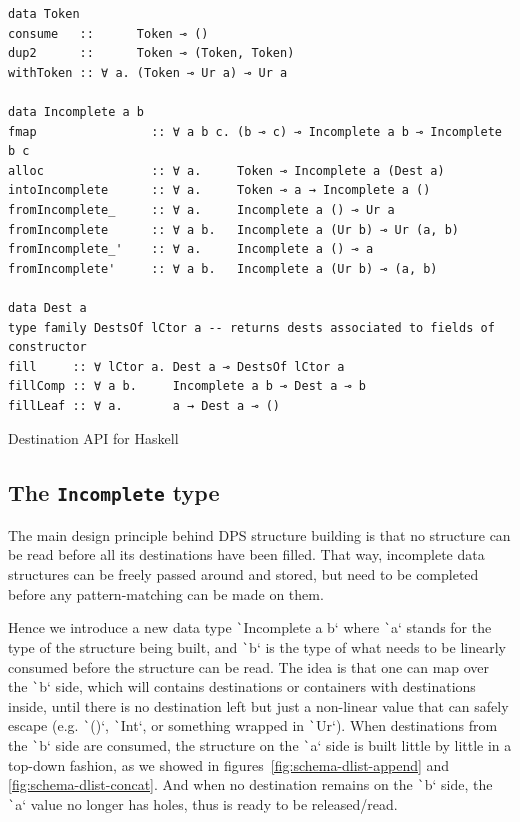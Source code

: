 \documentclass[english]{jflart}
\begin{document}
\begin{table}[t]
\small
\begin{verbatim}
data Token
consume   ::      Token ⊸ ()
dup2      ::      Token ⊸ (Token, Token)
withToken :: ∀ a. (Token ⊸ Ur a) ⊸ Ur a

data Incomplete a b
fmap                :: ∀ a b c. (b ⊸ c) ⊸ Incomplete a b ⊸ Incomplete b c
alloc               :: ∀ a.     Token ⊸ Incomplete a (Dest a)
intoIncomplete      :: ∀ a.     Token ⊸ a → Incomplete a ()
fromIncomplete_     :: ∀ a.     Incomplete a () ⊸ Ur a
fromIncomplete      :: ∀ a b.   Incomplete a (Ur b) ⊸ Ur (a, b)
fromIncomplete_'    :: ∀ a.     Incomplete a () ⊸ a
fromIncomplete'     :: ∀ a b.   Incomplete a (Ur b) ⊸ (a, b)

data Dest a
type family DestsOf lCtor a -- returns dests associated to fields of constructor
fill     :: ∀ lCtor a. Dest a ⊸ DestsOf lCtor a
fillComp :: ∀ a b.     Incomplete a b ⊸ Dest a ⊸ b
fillLeaf :: ∀ a.       a → Dest a ⊸ ()
\end{verbatim}
\caption{Destination API for Haskell}
\label{table:destination-api}
\end{table}

\subsection{The \texttt{Incomplete} type}

The main design principle behind DPS structure building is that no structure can be read before all its destinations have been filled. That way, incomplete data structures can be freely passed around and stored, but need to be completed before any pattern-matching can be made on them.

Hence we introduce a new data type \texttt`Incomplete a b` where \texttt`a` stands for the type of the structure being built, and \texttt`b` is the type of what needs to be linearly consumed before the structure can be read. The idea is that one can map over the \texttt`b` side, which will contains destinations or containers with destinations inside, until there is no destination left but just a non-linear value that can safely escape (e.g. \texttt`()`, \texttt`Int`, or something wrapped in \texttt`Ur`). When destinations from the \texttt`b` side are consumed, the structure on the \texttt`a` side is built little by little in a top-down fashion, as we showed in figures~\ref{fig:schema-dlist-append} and \ref{fig:schema-dlist-concat}. And when no destination remains on the \texttt`b` side, the \texttt`a` value no longer has holes, thus is ready to be released/read.
\end{document}
